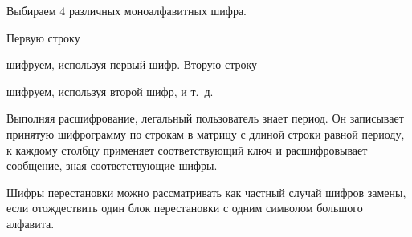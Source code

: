 Выбираем $4$ различных моноалфавитных шифра.

Первую строку

\begin{center}  \end{center}

шифруем, используя первый шифр. Вторую строку

\begin{center}  \end{center}

шифруем, используя второй шифр, и т.~д.

Выполняя расшифрование, легальный пользователь знает период. Он записывает принятую шифрограмму по строкам в матрицу с длиной строки равной периоду, к каждому столбцу применяет соответствующий ключ и расшифровывает сообщение, зная соответствующие шифры.

Шифры перестановки можно рассматривать как частный случай шифров замены, если отождествить один блок перестановки с одним символом большого алфавита.
